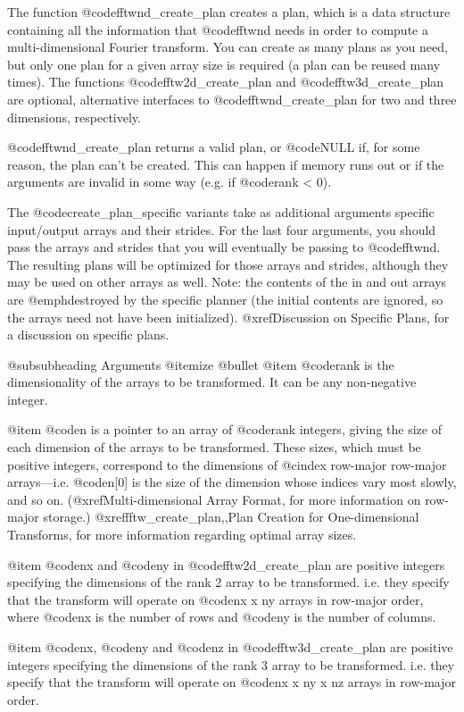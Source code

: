 The function @code{fftwnd_create_plan} creates a plan, which is a data
structure containing all the information that @code{fftwnd} needs in
order to compute a multi-dimensional Fourier transform.  You can create
as many plans as you need, but only one plan for a given array size is
required (a plan can be reused many times).  The functions
@code{fftw2d_create_plan} and @code{fftw3d_create_plan} are optional,
alternative interfaces to @code{fftwnd_create_plan} for two and three
dimensions, respectively.

@code{fftwnd_create_plan} returns a valid plan, or @code{NULL} if, for
some reason, the plan can't be created.  This can happen if memory runs
out or if the arguments are invalid in some way (e.g.  if @code{rank} <
0).

The @code{create_plan_specific} variants take as additional arguments
specific input/output arrays and their strides.  For the last four
arguments, you should pass the arrays and strides that you will
eventually be passing to @code{fftwnd}.  The resulting plans will be
optimized for those arrays and strides, although they may be used on
other arrays as well.  Note: the contents of the in and out arrays are
@emph{destroyed} by the specific planner (the initial contents are
ignored, so the arrays need not have been initialized).
@xref{Discussion on Specific Plans}, for a discussion on specific plans.

@subsubheading Arguments
@itemize @bullet
@item
@code{rank} is the dimensionality of the arrays to be transformed.  It
can be any non-negative integer.

@item
@code{n} is a pointer to an array of @code{rank} integers, giving the
size of each dimension of the arrays to be transformed.  These sizes,
which must be positive integers, correspond to the dimensions of
@cindex row-major
row-major arrays---i.e. @code{n[0]} is the size of the dimension whose
indices vary most slowly, and so on. (@xref{Multi-dimensional Array
Format}, for more information on row-major storage.)
@xref{fftw_create_plan,,Plan Creation for One-dimensional Transforms},
for more information regarding optimal array sizes.

@item
@code{nx} and @code{ny} in @code{fftw2d_create_plan} are positive
integers specifying the dimensions of the rank 2 array to be
transformed. i.e. they specify that the transform will operate on
@code{nx x ny} arrays in row-major order, where @code{nx} is the number
of rows and @code{ny} is the number of columns.

@item
@code{nx}, @code{ny} and @code{nz} in @code{fftw3d_create_plan} are
positive integers specifying the dimensions of the rank 3 array to be
transformed. i.e. they specify that the transform will operate on
@code{nx x ny x nz} arrays in row-major order.

